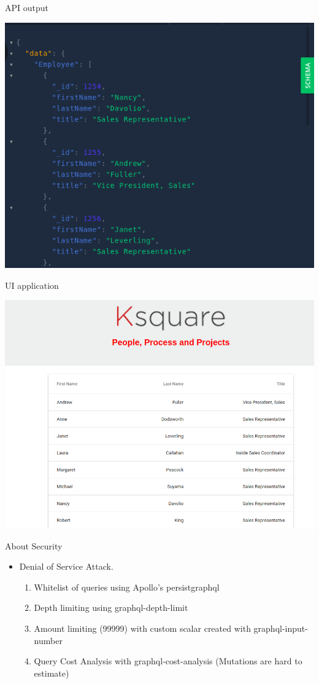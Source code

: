 \documentclass{beamer}
\begin{document}
\begin{frame}{API output}{ }

\begin{center}
	\includegraphics[width=0.7\linewidth]{img/graphqloutput.png}
\end{center}
\end{frame}

\begin{frame}{UI application}{ }

\begin{center}
	\includegraphics[width=0.7\linewidth]{img/reactoutput.png}
\end{center}
\end{frame}


\begin{frame}{About Security}{ }

\begin{itemize}
\item Denial of Service Attack.
		\begin{enumerate}
		\item Whitelist of queries using Apollo's persistgraphql
		\item Depth limiting using  graphql-depth-limit
		\item Amount limiting (99999) with custom scalar created with graphql-input-number
		\item Query Cost Analysis with graphql-cost-analysis (Mutations are hard to estimate)
		\end{enumerate}
		 
		 
\end{itemize}
\end{frame}
\end{document}
